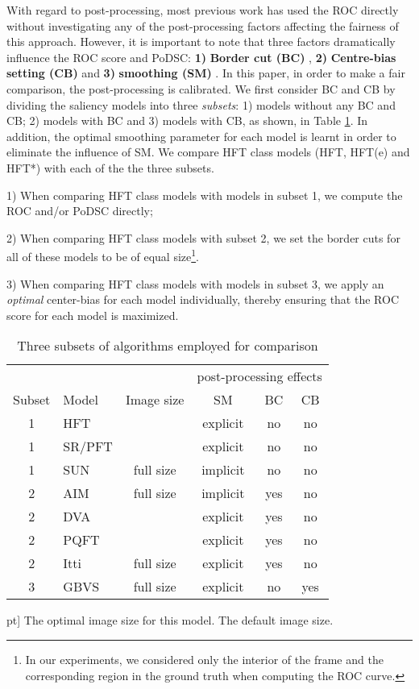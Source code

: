 \documentclass[10pt,journal,cspaper,compsoc]{IEEEtran}
\begin{document}
With regard to post-processing, most previous work has used the ROC directly without investigating any of the post-processing factors affecting the fairness of this approach. However, it is important to note that three factors dramatically influence the ROC score and PoDSC: {\bf 1)} {\bf Border cut (BC)} \cite{zhang2008sun}, {\bf 2)} {\bf Centre-bias setting (CB)} \cite{NIPS2006_897} and {\bf 3)} {\bf smoothing (SM)} \cite{ImageSignature2012,NIPS2006_897}.
In this paper, in order to make a fair comparison, the post-processing is calibrated. We first consider BC and CB by dividing the saliency models into three {\it subsets}: 1) models without any BC and CB; 2) models with BC and 3) models with CB, as shown, in Table \ref{alg_list}. In addition, the optimal smoothing parameter for each model is learnt in order to eliminate the influence of SM. We compare HFT class models (HFT, HFT(e) and HFT*) with each of the the three subsets.

1) When comparing HFT class models with models in subset 1, we compute the ROC and/or PoDSC directly;

2) When comparing HFT class models with subset 2, we set the border cuts for all of these models to be of equal size\footnote{In our experiments, we  considered only the interior of the frame and the corresponding region in the ground truth when computing the ROC curve.}.

3) When comparing HFT class models with models in subset 3, we apply an {\it optimal} center-bias for each model individually, thereby ensuring that the ROC score for each model is maximized.




\begin{table}[htbp] 	
\caption{Three subsets of algorithms employed for comparison}
\label{alg_list}	
\centering 	
\begin{tabular}{@{}clcccc@{}}
\toprule
&\multicolumn{1}{c}{}
&\multicolumn{1}{c}{}
&\multicolumn{3}{c}{post-processing effects}\\
 \cmidrule(lr){4-6}
\scriptsize{}  {Subset} & {Model} &  {Image size}
& {SM} & {BC} & {CB}\\
\midrule
1 &HFT  & & explicit & no & no\\
1 &SR/PFT  & & explicit & no & no\\
1 &SUN   &full size& implicit &  no & no\\
\midrule
2 &AIM  &  full size& implicit & yes & no\\
2 &DVA  &  & explicit & yes & no\\
2 &PQFT  && explicit & yes & no\\
2 &Itti  & full size & explicit  & yes & no\\
\midrule
3 &GBVS  & full size & explicit  & no & yes\\
\bottomrule 	
\end{tabular}\2pt]
    \footnotesize
    The optimal image size for this model. The default image size.
\end{table}
\end{document}
